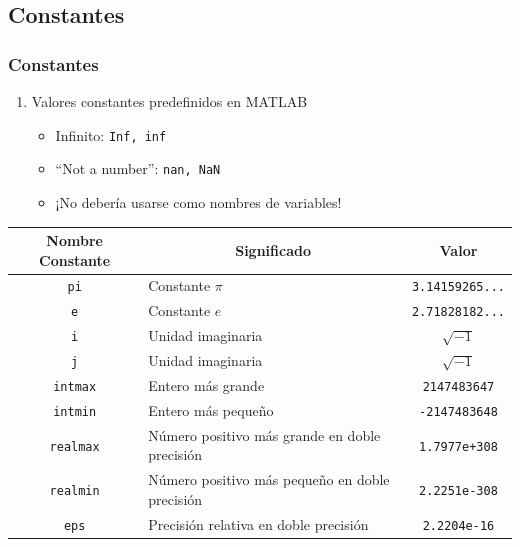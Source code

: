 \subsection{Constantes}
\begin{frame}[label=constantes,shrink=5]
 \frametitle{Constantes}
 \begin{enumerate}
  \item Valores constantes predefinidos en MATLAB
  \begin{itemize}
   \item Infinito: \texttt{Inf, inf}
   \item ``Not a number'': \texttt{nan, NaN}
   \item \alert{¡No debería usarse como nombres de variables!}
  \end{itemize}
 \end{enumerate}
 \begin{center}
  \begin{scriptsize}
   \begin{tabular}{|c|p{3.5cm}|c|}
   \multicolumn{1}{c}{\textbf{Nombre Constante}} 
   & \multicolumn{1}{c}{\textbf{Significado}} 
   & \multicolumn{1}{c}{\textbf{Valor}} \\ \toprule \hline
   \texttt{pi} & Constante $\pi$ & \texttt{3.14159265...} \\ \hline
   \texttt{e} & Constante $e$ & \texttt{2.71828182...} \\ \hline
   \texttt{i} & Unidad imaginaria & $\sqrt{-1}$ \\ \hline
   \texttt{j} & Unidad imaginaria & $\sqrt{-1}$ \\ \hline
   \texttt{intmax} & Entero más grande  & \texttt{2147483647} \\ \hline
   \texttt{intmin} & Entero más pequeño & \texttt{-2147483648} \\ \hline
   \texttt{realmax} & Número positivo más grande en doble precisión  &
\texttt{1.7977e+308} \\ \hline
   \texttt{realmin} & Número positivo más pequeño en doble precisión &
\texttt{2.2251e-308} \\ \hline
   \texttt{eps} & Precisión relativa en doble precisión & \texttt{2.2204e-16}
\\ \hline
  \end{tabular}
  \end{scriptsize}
 \end{center}
\end{frame}
